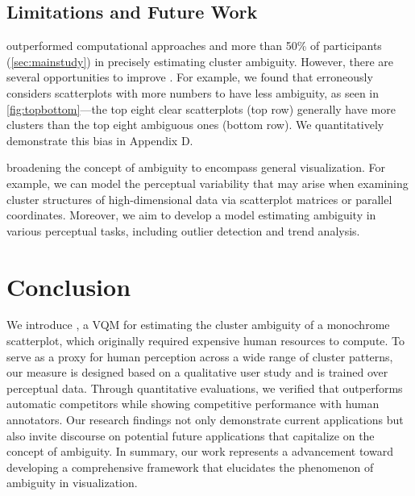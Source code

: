 \subsection{Limitations and Future Work}
\measure outperformed computational approaches and more than 50\% of participants (\autoref{sec:mainstudy}) in precisely estimating cluster ambiguity. However, there 
are several opportunities to improve \measure.
For example, we found that \measure erroneously considers scatterplots with more numbers to have less ambiguity, as seen in \autoref{fig:topbottom}---the top eight clear scatterplots (top row) generally have more clusters than the top eight ambiguous ones (bottom row). We quantitatively demonstrate this bias in Appendix D.

broadening the concept of ambiguity to encompass general visualization. 
For example, we can model the perceptual variability that may arise when examining cluster structures of high-dimensional data via scatterplot matrices or parallel coordinates. Moreover, we aim to develop a model estimating ambiguity in various perceptual tasks, including outlier detection and trend analysis.


\section{Conclusion}

We introduce \measure, a VQM for estimating the cluster ambiguity of a monochrome scatterplot, which originally required expensive human resources to compute. 
To serve as a proxy for human perception across a wide range of cluster patterns, our measure is designed based on a qualitative user study and is trained over perceptual data.
Through quantitative evaluations, we verified that \measure outperforms automatic competitors while showing competitive performance with human annotators. Our research findings not only demonstrate current applications but also invite discourse on potential future applications that capitalize on the concept of ambiguity.
In summary, our work represents a  advancement toward developing a comprehensive framework that elucidates the phenomenon of ambiguity in visualization. 

